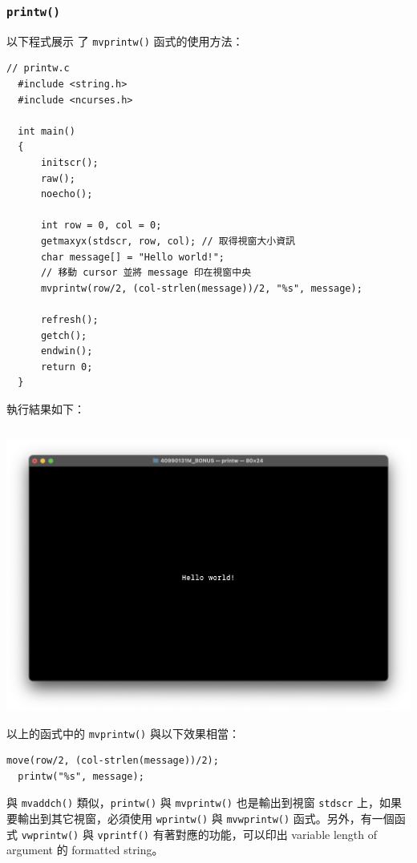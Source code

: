 \documentclass[12pt]{article}
\theoremstyle{definition}
\begin{document}
\subsubsection{\texttt{printw()}}
\noindent
\hypertarget{2.2.2}{以下程式展示}
了 \texttt{mvprintw()} 函式的使用方法：
\begin{lstlisting}[style=C]
  // printw.c
  #include <string.h>
  #include <ncurses.h>

  int main()
  {
      initscr();
      raw();
      noecho();
    
      int row = 0, col = 0;
      getmaxyx(stdscr, row, col); // 取得視窗大小資訊
      char message[] = "Hello world!";
      // 移動 cursor 並將 message 印在視窗中央
      mvprintw(row/2, (col-strlen(message))/2, "%s", message);
    
      refresh();
      getch();
      endwin();
      return 0;
  }
\end{lstlisting}
執行結果如下：
\begin{lstlisting}[style=zsh]
  % ./printw
\end{lstlisting}
\begin{center}
    \includegraphics[width=\linewidth]{printw.png}
\end{center}
以上的函式中的 \texttt{mvprintw()} 與以下效果相當：
\begin{lstlisting}[style=C*]
  move(row/2, (col-strlen(message))/2);
  printw("%s", message);
\end{lstlisting}
與 \texttt{mvaddch()} 類似，\texttt{printw()} 與 \texttt{mvprintw()} 也是輸出到視窗 \texttt{stdscr} 上，如果要輸出到其它視窗，\hypertarget{2.2.2a}{必須使用} \texttt{wprintw()} 與 \texttt{mvwprintw()} 函式。另外，有一個函式 \texttt{vwprintw()} 與 \texttt{vprintf()} 有著對應的功能，可以印出 variable length of argument 的 formatted string。
\end{document}
